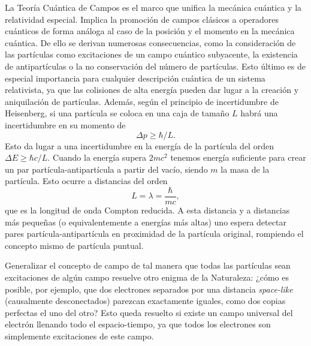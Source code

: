 La Teoría Cuántica de Campos es el marco que unifica la mecánica cuántica y la relatividad especial. Implica la promoción de campos clásicos a operadores cuánticos de forma análoga al caso de la posición y el momento en la mecánica cuántica. De ello se derivan numerosas consecuencias, como la consideración de las partículas como excitaciones de un campo cuántico subyacente, la existencia de antipartículas o la no conservación del número de partículas. Esto último es de especial importancia para cualquier descripción cuántica de un sistema relativista, ya que las colisiones de alta energía pueden dar lugar a la creación y aniquilación de partículas. Además, según el principio de incertidumbre de Heisenberg, si una partícula se coloca en una caja de tamaño $L$ habrá una incertidumbre en su momento de
\begin{equation*}
\Delta p\geq\hbar/L.
\end{equation*}
Esto da lugar a una incertidumbre en la energía de la partícula del orden $\Delta E\geq\hbar c/L$. Cuando la energía supera $2mc^2$ tenemos energía suficiente para crear un par partícula-antipartícula a partir del vacío, siendo $m$ la masa de la partícula. Esto ocurre a distancias del orden 
\begin{equation*}
L=\lambda=\frac{\hbar}{mc},
\end{equation*}
que es la longitud de onda Compton reducida. A esta distancia y a distancias más pequeñas (o equivalentemente a energías más altas) uno espera detectar pares partícula-antipartícula en proximidad de la partícula original, rompiendo el concepto mismo de partícula puntual. 

Generalizar el concepto de campo de tal manera que todas las partículas sean excitaciones de algún campo resuelve otro enigma de la Naturaleza: ¿cómo es posible, por ejemplo, que dos electrones separados por una distancia \textit{space-like} (causalmente desconectados) parezcan exactamente iguales, como dos copias perfectas el uno del otro? Esto queda resuelto si existe un campo universal del electrón llenando todo el espacio-tiempo, ya que todos los electrones son simplemente excitaciones de este campo. 


